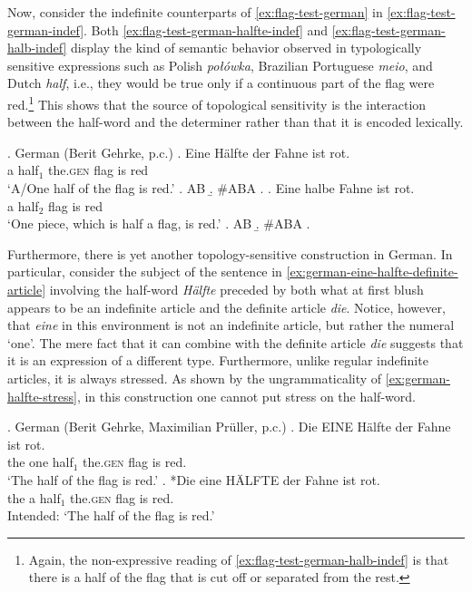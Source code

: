 Now, consider the indefinite counterparts of \ref{ex:flag-test-german} in \ref{ex:flag-test-german-indef}. Both \ref{ex:flag-test-german-halfte-indef} and \ref{ex:flag-test-german-halb-indef} display the kind of semantic behavior observed in typologically sensitive expressions such as Polish \textit{połówka}, Brazilian Portuguese \textit{meio}, and Dutch \textit{half}, i.e., they would be true only if a continuous part of the flag were red.\footnote{Again, the non-expressive reading of \ref{ex:flag-test-german-halb-indef} is that there is a half of the flag that is cut off or separated from the rest.} This shows that the source of topological sensitivity is the interaction between the half-word and the determiner rather than that it is encoded lexically.  

\ex. German (Berit Gehrke, p.c.)\label{ex:flag-test-german-indef}
\ag. Eine Hälfte der Fahne ist rot.\label{ex:flag-test-german-halfte-indef}\\
a half$_1$ the\textsc{.gen} flag is red\\
`A/One half of the flag is red.'
		\a. AB
		\b. \#ABA
		\z.
\bg. Eine halbe Fahne ist rot.\label{ex:flag-test-german-halb-indef}\\
a half$_2$  flag is red\\
`One piece, which is half a flag, is red.'
		\a. AB
		\b. \#ABA
		\z.

Furthermore, there is yet another topology-sensitive construction in German. In particular, consider the subject of the sentence in \ref{ex:german-eine-halfte-definite-article} involving the half-word \textit{Hälfte} preceded by both what at first blush appears to be an indefinite article and the definite article \textit{die}. Notice, however, that \textit{eine} in this environment is not an indefinite article, but rather the numeral `one'. The mere fact that it can combine with the definite article \textit{die} suggests that it is an expression of a different type. Furthermore, unlike regular indefinite articles, it is always stressed. As shown by the ungrammaticality of \ref{ex:german-halfte-stress}, in this construction one cannot put stress on the half-word.\largerpage

\ex. German (Berit Gehrke, Maximilian Prüller, p.c.)\label{ex:german-eine-halfte}
\ag. Die EINE Hälfte der Fahne ist rot.\label{ex:german-eine-halfte-definite-article}\\
the one half$_1$ the\textsc{.gen} flag is red.\\
`The half of the flag is red.'
\bg. *Die eine HÄLFTE der Fahne ist rot.\label{ex:german-halfte-stress}\\
the a half$_1$ the\textsc{.gen} flag is red.\\
Intended: `The half of the flag is red.'

